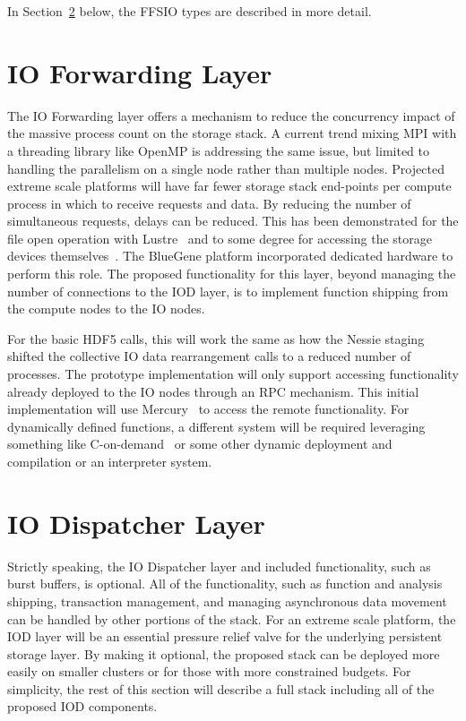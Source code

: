 \documentclass[conference]{IEEEtran}
\begin{document}
In Section~\ref{sec:iod} below, the FFSIO types are described in more detail.

\section{IO Forwarding Layer}
\label{sec:iof}

The IO Forwarding layer offers a mechanism to reduce the concurrency impact of
the massive process count on the storage stack. A current trend mixing MPI with
a threading library like OpenMP is addressing the same issue, but limited to
handling the parallelism on a single node rather than multiple nodes. Projected
extreme scale platforms will have far fewer storage stack end-points per
compute process in which to receive requests and data. By reducing the number
of simultaneous requests, delays can be reduced. This has been demonstrated for
the file open operation with Lustre~\cite{lofstead:2009:adaptable} and to some
degree for accessing the storage devices
themselves~\cite{lofstead:2010:io-variability}.  The BlueGene platform
incorporated dedicated hardware to perform this role. The proposed
functionality for this layer, beyond managing the number of connections to the
IOD layer, is to implement function shipping from the compute nodes to the IO
nodes.

For the basic HDF5 calls, this will work the same as how the Nessie
staging~\cite{lofstead:2011:nessie-staging} shifted the collective IO data
rearrangement calls to a reduced number of processes. The prototype
implementation will only support accessing functionality already deployed to
the IO nodes through an RPC mechanism. This initial implementation will use
Mercury~\cite{Soumagne:2013:mercury} to access the remote functionality. For
dynamically defined functions, a different system will be required leveraging
something like C-on-demand~\cite{abbasi:2011:c-on-demand} or some other dynamic
deployment and compilation or an interpreter system.

\section{IO Dispatcher Layer}
\label{sec:iod}

Strictly speaking, the IO Dispatcher layer and included functionality, such as
burst buffers, is optional. All of the functionality, such as function and
analysis shipping, transaction management, and managing asynchronous data
movement can be handled by other portions of the stack. For an extreme scale
platform, the IOD layer will be an essential pressure relief valve for the
underlying persistent storage layer. By making it optional, the proposed stack
can be deployed more easily on smaller clusters or for those with more
constrained budgets. For simplicity, the rest of this section will describe a
full stack including all of the proposed IOD components.
\end{document}
